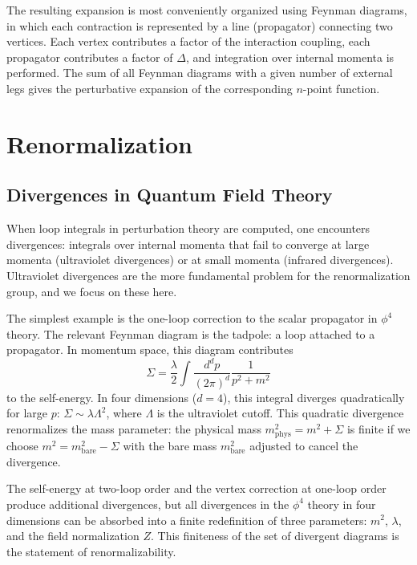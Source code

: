 \documentclass[11pt, twoside, openright]{book}
\theoremstyle{dotted}
\theoremstyle{definition}
\begin{document}
The resulting expansion is most conveniently organized using Feynman diagrams, in
which each contraction is represented by a line (propagator) connecting two
vertices. Each vertex contributes a factor of the interaction coupling, each
propagator contributes a factor of $\Delta$, and integration over internal momenta
is performed. The sum of all Feynman diagrams with a given number of external legs
gives the perturbative expansion of the corresponding $n$-point function.

\chapter{Renormalization}
\label{ch:renormalization}

\section{Divergences in Quantum Field Theory}

When loop integrals in perturbation theory are computed, one encounters divergences:
integrals over internal momenta that fail to converge at large momenta (ultraviolet
divergences) or at small momenta (infrared divergences). Ultraviolet divergences
are the more fundamental problem for the renormalization group, and we focus on
these here.

The simplest example is the one-loop correction to the scalar propagator in $\phi^4$
theory. The relevant Feynman diagram is the tadpole: a loop attached to a propagator.
In momentum space, this diagram contributes
\begin{equation}
  \Sigma = \frac{\lambda}{2}\int \frac{d^dp}{(2\pi)^d} \frac{1}{p^2 + m^2}
  \label{eq:tadpole}
\end{equation}
to the self-energy. In four dimensions ($d = 4$), this integral diverges quadratically
for large $p$: $\Sigma \sim \lambda\Lambda^2$, where $\Lambda$ is the ultraviolet
cutoff. This quadratic divergence renormalizes the mass parameter: the physical mass
$m_{\text{phys}}^2 = m^2 + \Sigma$ is finite if we choose $m^2 = m_{\text{bare}}^2 - \Sigma$
with the bare mass $m_{\text{bare}}^2$ adjusted to cancel the divergence.

The self-energy at two-loop order and the vertex correction at one-loop order
produce additional divergences, but all divergences in the $\phi^4$ theory in four
dimensions can be absorbed into a finite redefinition of three parameters: $m^2$,
$\lambda$, and the field normalization $Z$. This finiteness of the set of divergent
diagrams is the statement of renormalizability.
\end{document}
